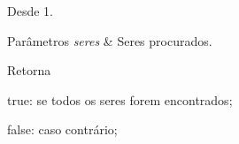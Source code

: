 \begin{DoxySince}{Desde}
1.
\end{DoxySince}

\begin{DoxyParams}{Parâmetros}
{\em seres} & Seres procurados. \\
\hline
\end{DoxyParams}
\begin{DoxyReturn}{Retorna}

\begin{DoxyItemize}
\item true\-: se todos os seres forem encontrados; 
\item false\-: caso contrário; 
\end{DoxyItemize}
\end{DoxyReturn}

